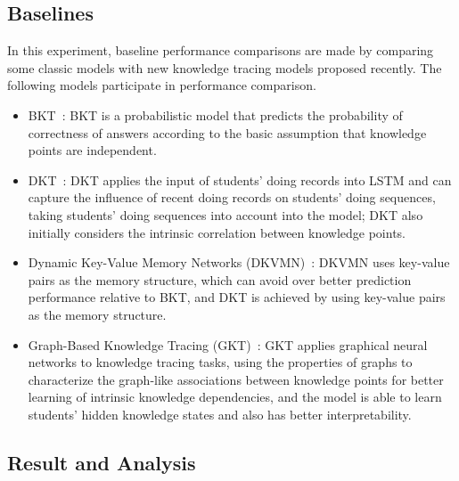 \subsection{Baselines}
In this experiment, baseline performance comparisons are made by comparing some classic models with new knowledge tracing models proposed recently. The following models participate in performance comparison.
\begin{itemize}
    \item BKT~\cite{yudelson2013individualized}: BKT is a probabilistic model that predicts the probability of correctness of answers according to the basic assumption that knowledge points are independent.
    \item DKT~\cite{piech2015deep}: DKT applies the input of students' doing records into LSTM and can capture the influence of recent doing records on students' doing sequences, taking students' doing sequences into account into the model; DKT also initially considers the intrinsic correlation between knowledge points.
    \item Dynamic Key-Value Memory Networks (DKVMN)~\cite{zhang2017dynamic}: DKVMN uses key-value pairs as the memory structure, which can avoid over better prediction performance relative to BKT, and DKT is achieved by using key-value pairs as the memory structure.
    \item Graph-Based Knowledge Tracing (GKT)~\cite{nakagawa2019graph}: GKT applies graphical neural networks to knowledge tracing tasks, using the properties of graphs to characterize the graph-like associations between knowledge points for better learning of intrinsic knowledge dependencies, and the model is able to learn students' hidden knowledge states and also has better interpretability.
\end{itemize}

\subsection{Result and Analysis}

